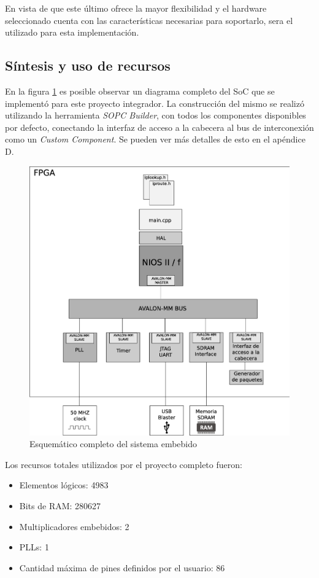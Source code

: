 En vista de que este último ofrece la mayor flexibilidad y el hardware seleccionado cuenta con las características necesarias para soportarlo, sera el utilizado para esta implementación. 


\subsection{Síntesis y uso de recursos}

En la figura \ref{fig:comple} es posible observar un diagrama completo del SoC que se implementó para este proyecto integrador. La construcción del mismo se realizó utilizando la herramienta \textit{SOPC Builder}, con todos los componentes disponibles por defecto, conectando la interfaz de acceso a la cabecera al bus de interconexión como un \textit{Custom Component}. Se pueden ver más detalles de esto en el apéndice D.
\begin{figure}[H]
  \centering
	\includegraphics[scale=0.28]{4-implementacion/graf/sistema.eps}
  \caption{Esquemático completo del sistema embebido}
  \label{fig:comple}
\end{figure}

Los recursos totales utilizados por el proyecto completo fueron:
\begin{itemize}
\item Elementos lógicos: 4983
	\item Bits de RAM: 280627
	\item Multiplicadores embebidos: 2
	\item PLLs: 1
	\item Cantidad máxima de pines definidos por el usuario: 86
\end{itemize}

